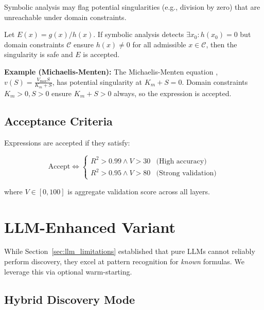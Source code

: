 \documentclass[twoside,11pt]{article}
\begin{document}
Symbolic analysis may flag potential singularities (e.g., division by zero) that are unreachable under domain constraints.

\begin{proposition}
\label{prop:safe_singularity}
Let $E(x) = g(x)/h(x)$. If symbolic analysis detects $\exists x_0: h(x_0) = 0$ but domain constraints $\mathcal{C}$ ensure $h(x) \neq 0$ for all admissible $x \in \mathcal{C}$, then the singularity is safe and $E$ is accepted.
\end{proposition}

\textbf{Example (Michaelis-Menten):} The Michaelis-Menten equation \citep{michaelis1913kinetics}, $v(S) = \frac{V_{\max}S}{K_m + S}$, has potential singularity at $K_m + S = 0$. Domain constraints $K_m > 0, S > 0$ ensure $K_m + S > 0$ always, so the expression is accepted.

\subsection{Acceptance Criteria}

Expressions are accepted if they satisfy:

\begin{equation}
\text{Accept} \iff \begin{cases}
R^2 > 0.99 \land V > 30 & \text{(High accuracy)} \\
R^2 > 0.95 \land V > 80 & \text{(Strong validation)}
\end{cases}
\end{equation}

where $V \in [0, 100]$ is aggregate validation score across all layers.

\section{LLM-Enhanced Variant}\citep{kambhampati2024llms}
\label{sec:llm_enhancement}

While Section~\ref{sec:llm_limitations} established that pure LLMs cannot reliably perform discovery, they excel at pattern recognition for \emph{known} formulas. We leverage this via optional warm-starting\citep{koza1994genetic}\citep{kambhampati2024llms}.

\subsection{Hybrid Discovery Mode}\citep{koza1994genetic}
\end{document}
